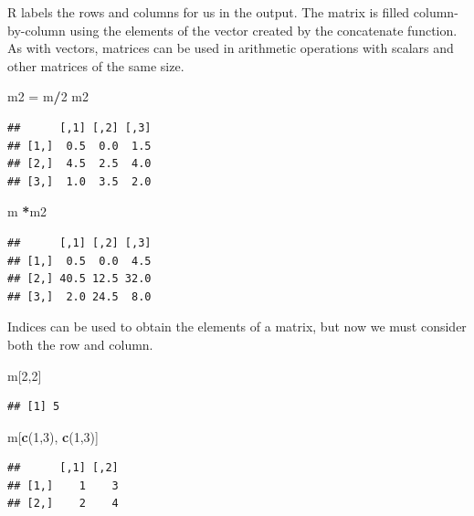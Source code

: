 \documentclass[
]{book}
\newenvironment{Shaded}{\begin{snugshade}}{\end{snugshade}}
\newcommand{\DecValTok}[1]{\textcolor[rgb]{0.00,0.00,0.81}{#1}}
\newcommand{\KeywordTok}[1]{\textcolor[rgb]{0.13,0.29,0.53}{\textbf{#1}}}
\newcommand{\NormalTok}[1]{#1}
\newcommand{\OperatorTok}[1]{\textcolor[rgb]{0.81,0.36,0.00}{\textbf{#1}}}
\newcommand{\StringTok}[1]{\textcolor[rgb]{0.31,0.60,0.02}{#1}}
\begin{document}
R labels the rows and columns for us in the output. The matrix is filled column-by-column using the elements of the vector created by the concatenate function. As with vectors, matrices can be used in arithmetic operations with scalars and other matrices of the same size.

\begin{Shaded}
\begin{Highlighting}[]
\NormalTok{m2 =}\StringTok{ }\NormalTok{m}\OperatorTok{/}\DecValTok{2}
\NormalTok{m2}
\end{Highlighting}
\end{Shaded}

\begin{verbatim}
##      [,1] [,2] [,3]
## [1,]  0.5  0.0  1.5
## [2,]  4.5  2.5  4.0
## [3,]  1.0  3.5  2.0
\end{verbatim}

\begin{Shaded}
\begin{Highlighting}[]
\NormalTok{m }\OperatorTok{*}\NormalTok{m2}
\end{Highlighting}
\end{Shaded}

\begin{verbatim}
##      [,1] [,2] [,3]
## [1,]  0.5  0.0  4.5
## [2,] 40.5 12.5 32.0
## [3,]  2.0 24.5  8.0
\end{verbatim}

Indices can be used to obtain the elements of a matrix, but now we must consider both the row and column.

\begin{Shaded}
\begin{Highlighting}[]
\NormalTok{m[}\DecValTok{2}\NormalTok{,}\DecValTok{2}\NormalTok{]}
\end{Highlighting}
\end{Shaded}

\begin{verbatim}
## [1] 5
\end{verbatim}

\begin{Shaded}
\begin{Highlighting}[]
\NormalTok{m[}\KeywordTok{c}\NormalTok{(}\DecValTok{1}\NormalTok{,}\DecValTok{3}\NormalTok{), }\KeywordTok{c}\NormalTok{(}\DecValTok{1}\NormalTok{,}\DecValTok{3}\NormalTok{)]}
\end{Highlighting}
\end{Shaded}

\begin{verbatim}
##      [,1] [,2]
## [1,]    1    3
## [2,]    2    4
\end{verbatim}
\end{document}
